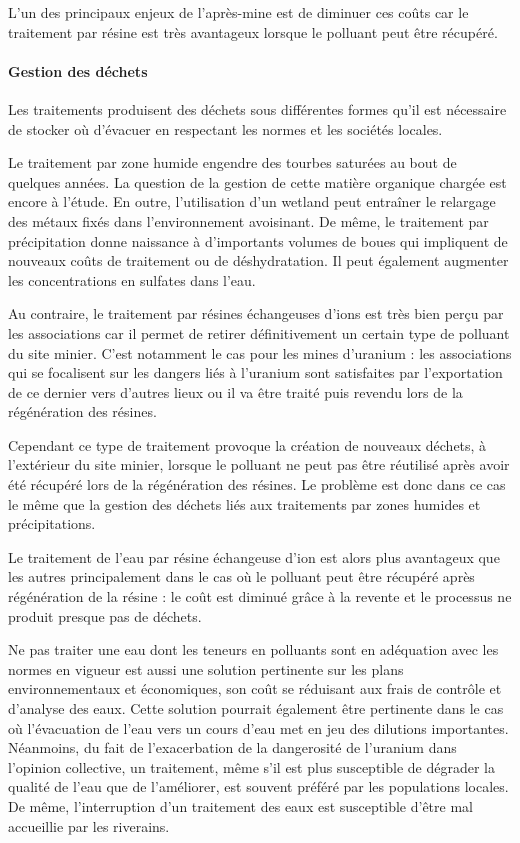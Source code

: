 \documentclass{article}
\begin{document}
L’un des principaux enjeux de l’après-mine est de diminuer ces coûts car le traitement par résine est très avantageux lorsque le polluant peut être récupéré.

\paragraph{Gestion des déchets }

Les traitements produisent des déchets sous différentes formes qu’il est nécessaire de stocker où d’évacuer en respectant les normes et les sociétés locales.

Le traitement par zone humide engendre des tourbes saturées au bout de quelques années. La question de la gestion de cette matière organique chargée est encore à l’étude. En outre, l’utilisation d’un wetland peut entraîner le relargage des métaux fixés dans l’environnement avoisinant.
De même, le traitement par précipitation donne naissance à d’importants volumes de boues qui impliquent de nouveaux coûts de traitement ou de déshydratation. Il peut également augmenter les concentrations en sulfates dans l’eau. 

Au contraire, le traitement par résines échangeuses d’ions est très bien perçu par les associations car il permet de retirer définitivement un certain type de polluant du site minier. C’est notamment le cas pour les mines d’uranium : les associations qui se focalisent sur les dangers liés à l’uranium sont satisfaites par l’exportation de ce dernier vers d’autres lieux ou il va être traité puis revendu lors de la régénération des résines.

Cependant ce type de traitement provoque la création de nouveaux déchets, à l’extérieur du site minier, lorsque le polluant ne peut pas être réutilisé après avoir été récupéré lors de la régénération des résines. Le problème est donc dans ce cas le même que la gestion des déchets liés aux traitements par zones humides et précipitations.

Le traitement de l’eau par résine échangeuse d’ion est alors plus avantageux que les autres principalement dans le cas où le polluant peut être récupéré après régénération de la résine : le coût est diminué grâce à la revente et le processus ne produit presque pas de déchets.

Ne pas traiter une eau dont les teneurs en polluants sont en adéquation avec les normes en vigueur est aussi une solution pertinente sur les plans environnementaux et économiques, son coût se réduisant aux frais de contrôle et d’analyse des eaux. Cette solution pourrait également être pertinente dans le cas où l’évacuation de l’eau vers un cours d’eau met en jeu des dilutions importantes. Néanmoins, du fait de l’exacerbation de la dangerosité de l’uranium dans l’opinion collective, un traitement, même s’il est plus susceptible de dégrader la qualité de l’eau que de l’améliorer, est souvent préféré par les populations locales. De même, l’interruption d’un traitement des eaux est susceptible d’être mal accueillie par les riverains.
\end{document}
